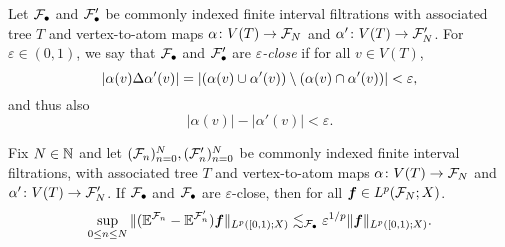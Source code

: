 \begin{figure}
\begin{center}
      \end{center}
\end{figure}

\begin{defn}
  Let $\mathcal{F}_{\bullet}$ and $\mathcal{F}_{\bullet}'$ be commonly indexed finite interval filtrations with associated tree $T$ and vertex-to-atom maps $\alpha \colon V(T) \rightarrow \mathcal{F}_{N}$ and $\alpha' \colon V(T) \rightarrow \mathcal{F}_{N}'$.
  For $\varepsilon \in (0,1)$, we say that $\mathcal{F}_{\bullet}$ and $\mathcal{F}_{\bullet}'$ are \emph{$\varepsilon$-close} if for all $v \in V(T)$,
  \begin{equation*}
    |\alpha(v) \Delta \alpha'(v)| = |(\alpha(v) \cup \alpha'(v)) \setminus (\alpha(v) \cap \alpha'(v))| < \varepsilon,
  \end{equation*}
  and thus also
  \begin{equation*}
    |\alpha(v)| - |\alpha'(v)| < \varepsilon.
  \end{equation*}
\end{defn}

\begin{lem}\label{lem:closeness}
  Fix $N \in \mathbb{N}$ and let $(\mathcal{F}_{n})_{n=0}^{N}, (\mathcal{F}'_{n})_{n=0}^{N}$ be commonly indexed finite interval filtrations, with associated tree $T$ and vertex-to-atom maps $\alpha \colon V(T) \rightarrow \mathcal{F}_{N}$ and $\alpha' \colon V(T) \rightarrow \mathcal{F}_{N}'$.
  If $\mathcal{F}_{\bullet}$ and $\mathcal{F}_{\bullet}$ are $\varepsilon$-close, then for all $\bm{f} \in L^p(\mathcal{F}_{N};X)$.
  \begin{equation*}
    \sup_{0 \leq n \leq N} \|(\mathbb{E}^{\mathcal{F}_{n}} - \mathbb{E}^{\mathcal{F}_{n}'})\bm{f}\|_{L^p([0,1);X)} \lesssim_{\mathcal{F}_{\bullet}} \varepsilon^{1/p} \|\bm{f}\|_{L^p([0,1);X)}.
  \end{equation*}
\end{lem}

